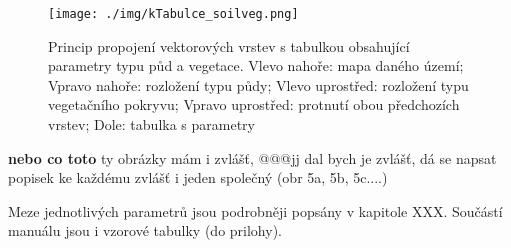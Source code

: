 % 





\begin{figure}[h!]
  \centering
  \texttt{[image: ./img/kTabulce\_soilveg.png]}
  \caption{Princip propojení vektorových vrstev s tabulkou obsahující parametry typu půd a vegetace. Vlevo nahoře: mapa daného území;  Vpravo nahoře: rozložení typu půdy; Vlevo uprostřed:  rozložení typu vegetačního pokryvu; Vpravo uprostřed: protnutí obou předchozích vrstev; Dole: tabulka s parametry }
  \label{fig:pripravapar_vyrez}
\end{figure}






\textbf{nebo co toto} ty obrázky mám i zvlášť, @@@jj dal bych je zvlášť, dá se napsat popisek ke každému zvlášť i jeden společný (obr 5a, 5b, 5c....)


Meze jednotlivých parametrů jsou podrobněji popsány v kapitole XXX. 
Součástí manuálu jsou i vzorové tabulky (do prilohy).



